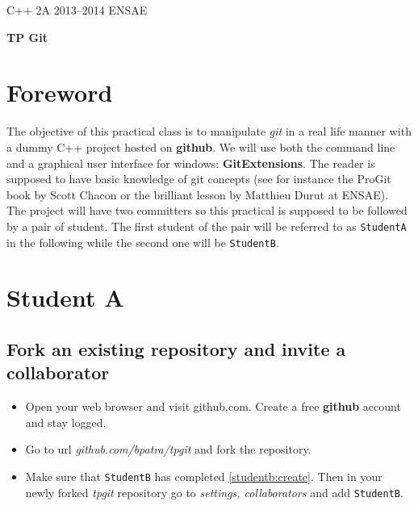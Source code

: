\documentclass[11pt,amsfonts,amsmath]{article}
\begin{document}
\noindent%
C++ 2A 2013--2014 \hfill ENSAE \\

\begin{center}
{\bf TP Git}
\end{center}

\section{Foreword}
The objective of this practical class is to manipulate \emph{git} in a real life manner with a dummy C++ project hosted on \textbf{github}. We will use both the command line and a graphical user interface for windows: \textbf{GitExtensions}. The reader is supposed to have basic knowledge of git concepts (see for instance the ProGit book by Scott Chacon or the brilliant lesson by Matthieu Durut at ENSAE).\\

The project will have two committers so this practical is supposed to be followed by a pair of student. The first student of the pair will be referred to as \texttt{StudentA} in the following while the second one will be \texttt{StudentB}.

\section{Student A}
\subsection{Fork an existing repository and invite a collaborator}
\begin{itemize}
\item Open your web browser and visit github.com. Create a free \textbf{github} account and stay logged.
\item Go to url \emph{github.com/bpatra/tpgit} and fork the repository.
\item Make sure that \texttt{StudentB} has completed \ref{studentb:create}. Then in your newly forked \emph{tpgit} repository go to \emph{settings, collaborators} and add \texttt{StudentB}.
\end{itemize}
\end{document}
